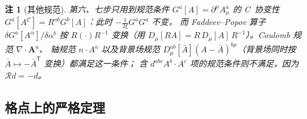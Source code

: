 \documentclass[UTF8,a4paper,11pt,fontset=fandol]{ctexart}
\theoremstyle{cplain}
\theoremstyle{cdefinition}
\theoremstyle{cremark}
\newtheorem{remark}[theorem]{注}
\numberwithin{equation}{section}
\newcommand{\tp}{\mathsf{T}}                         %
\newcommand{\Cop}{\mathcal{C}}                       %
\newcommand{\Rop}{\mathcal{R}}                       %
\begin{document}
\begin{remark}[其他规范]\label{rem:np-gauges}
第六、七步只用到规范条件 $G^a[A]=\partial^\mu A^a_\mu$ 的 C~协变性 $G^a[A^{\Cop}]=R^{ab}G^b[A]$：此时 $-\frac1{2\xi}G^aG^a$ 不变，
而 Faddeev--Popov 算子 $\delta G^a[A^\alpha]/\delta\alpha^b$ 按 $R(\cdot)R^{-1}$ 变换（用 $D_\mu[RA]=R\,D_\mu[A]\,R^{-1}$）。Coulomb 规范 $\nabla\cdot\boldsymbol A^a$、
轴规范 $n\cdot A^a$ 以及背景场规范 $D^{ab}_\mu[\bar A](A-\bar A)^{b\mu}$（背景场同时按 $\bar A\mapsto-\bar A^{\tp}$ 变换）都满足这一条件；
含 $d^{abc}A^b\cdot A^c$ 项的规范条件则不满足，因为 $\Rop d=-d$。
\end{remark}

\subsection{格点上的严格定理}\label{sec:nonpert-lattice}
\end{document}
